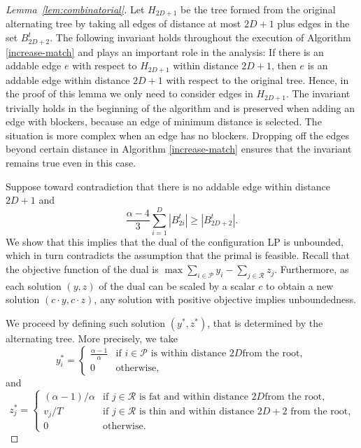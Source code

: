 \documentclass{llncs}
\newcommand{\res}{\ensuremath{\mathcal{R}}\xspace}
\newcommand{\players}{\ensuremath{\mathcal{P}}\xspace}
\begin{document}
\begin{proof}[Lemma~\ref{lem:combinatorial}]
Let $H_{2D+1}$ be the tree formed from the original alternating tree by taking
all edges of distance at most $2D+1$ plus edges in the set $B^t_{2D+2}$. The
following invariant holds throughout the execution of Algorithm
\ref{increase-match} and plays an important role in the analysis:
If there is an addable edge $e$ with respect to $H_{2D+1}$ within distance
$2D+1$, then $e$ is an addable edge within distance $2D+1$ with respect to the
original tree. Hence, in the proof of this lemma we only need to consider edges
in $H_{2D+1}$. The invariant trivially holds in the beginning of the algorithm
and is preserved when adding an edge with blockers, because an edge of minimum
distance is selected. The situation is more complex when an edge has no
blockers. Dropping off the edges beyond certain distance in Algorithm
\ref{increase-match} ensures that the invariant remains true even in this case.

Suppose toward contradiction that there is no addable edge within
distance $2D+1$ and
\begin{equation*}
  \frac{\alpha-4}{3} \sum_{i=1}^D |B^t_{2i}| \geq |B^t_{2D+2}|.
\end{equation*}
We show that this implies that the dual of the configuration LP is
unbounded, which in turn contradicts the assumption that the primal is feasible.
Recall that the objective function of the dual is $\max \sum_{i\in \players} y_i
- \sum_{j\in \res} z_j$.  Furthermore, as each solution $(y,z)$ of the dual can
be scaled by a scalar $c$ to obtain a new solution $(c\cdot y, c \cdot z)$, any
solution with positive objective implies unboundedness.

We proceed by defining such solution $(y^*, z^*)$, that is determined by the alternating tree.
More precisely, we take
\begin{equation*}
   y^*_i = \begin{cases}
     \frac{\alpha-1}{\alpha}  & \mbox{if $i\in\players$ is within distance $2D$
     from the root},\\
     0 & \mbox{otherwise,}
   \end{cases}
\end{equation*}
and
\begin{equation*}
  z_j^* = \begin{cases}
    (\alpha-1)/\alpha  & \mbox{if $j\in\res$ is fat and within distance $2D$
    from the root,}\\
    v_j/T & \mbox{if $j\in\res$ is thin and within distance $2D+2$ from the
    root,} \\
    0 & \mbox{otherwise.}
  \end{cases}
\end{equation*}


\end{proof}
\end{document}

